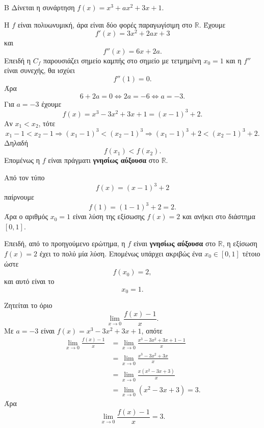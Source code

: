 
\begin{thema}{Β}
Δίνεται η συνάρτηση $f(x)=x^3+ax^2+3x+1$.

\begin{erwthma}
\item Η $f$ είναι πολυωνυμική, άρα είναι δύο φορές παραγωγίσιμη στο $\mathbb{R}$. Έχουμε
\[
f'(x)=3x^2+2ax+3
\]
και
\[
f''(x)=6x+2a.
\]
Επειδή η $C_f$ παρουσιάζει σημείο καμπής στο σημείο με τετμημένη $x_0=1$ και η $f''$ είναι συνεχής, θα ισχύει
\[
f''(1)=0.
\]
Άρα
\[
6+2a=0\Leftrightarrow 2a=-6\Leftrightarrow a=-3.
\]
Για $a=-3$ έχουμε
\[
f(x)=x^3-3x^2+3x+1=(x-1)^3+2.
\]
Αν $x_1<x_2$, τότε
\[
x_1-1<x_2-1\Rightarrow (x_1-1)^3<(x_2-1)^3
\Rightarrow (x_1-1)^3+2<(x_2-1)^3+2.
\]
Δηλαδή
\[
f(x_1)<f(x_2).
\]
Επομένως η $f$ είναι πράγματι \textbf{γνησίως αύξουσα} στο $\mathbb{R}$.

\item Από τον τύπο
\[
f(x)=(x-1)^3+2
\]
παίρνουμε
\[
f(1)=(1-1)^3+2=2.
\]
Άρα ο αριθμός $x_0=1$ είναι λύση της εξίσωσης $f(x)=2$ και ανήκει στο διάστημα $[0,1]$.

Επειδή, από το προηγούμενο ερώτημα, η $f$ είναι \textbf{γνησίως αύξουσα} στο $\mathbb{R}$, η εξίσωση $f(x)=2$ έχει το πολύ μία λύση. Επομένως υπάρχει ακριβώς ένα $x_0\in[0,1]$ τέτοιο ώστε
\[
f(x_0)=2,
\]
και αυτό είναι το
\[
x_0=1.
\]

\item Ζητείται το όριο
\[
\lim_{x\to0}\frac{f(x)-1}{x}.
\]
Με $a=-3$ είναι $f(x)=x^3-3x^2+3x+1$, οπότε
\begin{align*}
\lim_{x\to0}\frac{f(x)-1}{x}
&=\lim_{x\to0}\frac{x^3-3x^2+3x+1-1}{x}\\
&=\lim_{x\to0}\frac{x^3-3x^2+3x}{x}\\
&=\lim_{x\to0}\frac{x(x^2-3x+3)}{x}\\
&=\lim_{x\to0}(x^2-3x+3)=3.
\end{align*}
Άρα
\[
\lim_{x\to0}\frac{f(x)-1}{x}=3.
\]


\end{erwthma}
\end{thema}
